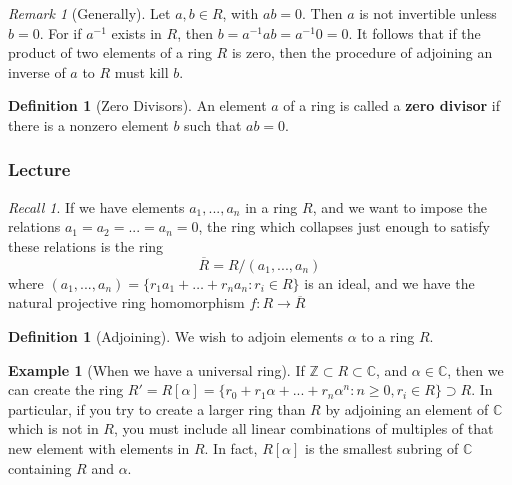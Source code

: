 \documentclass[12pt]{article}
\theoremstyle{definition}
\newtheorem{defn}[thm]{Definition}
\newtheorem{eg}[thm]{Example}
\theoremstyle{remark}
\newtheorem{rmk}[thm]{Remark}
\newtheorem*{rec}{Recall}
\numberwithin{equation}{section}
\newcommand\C{\mathbb C}    %
\newcommand\Z{\mathbb Z}    %
\newcommand\B[1]{\textbf{ #1}}
\begin{document}
\vspace{15pt}

\begin{rmk}[Generally]
        Let $a,b \in R$, with $ab = 0$. Then $a$ is not invertible unless $b=0$. For if $a^{-1}$ exists in $R$, then $b = a^{-1}ab = a^{-1}0 = 0$. It follows that if the product of two elements of a ring $R$ is zero, then the procedure of adjoining an inverse of $a$ to $R$ must kill $b$. 
\end{rmk}


\vspace{15pt}


\begin{defn}[Zero Divisors]
        An element $a$ of a ring is called a \B{zero divisor} if there is a nonzero element $b$ such that $ab = 0$.
\end{defn}


\subsubsection{Lecture}

\begin{rec}
        If we have elements $a_1,...,a_n$ in a ring $R$, and we want to impose the relations $a_1=a_2=...=a_n = 0$, the ring which collapses just enough to satisfy these relations is the ring \begin{equation}
                \overline{R} = R/(a_1,...,a_n)
        \end{equation}
        where $(a_1,...,a_n) = \{r_1a_1+\hdots +r_na_n: r_i \in R\}$ is an ideal, and we have the natural projective ring homomorphism $f:R\rightarrow \overline{R}$
\end{rec}

\vspace{15pt}

\begin{defn}[Adjoining]
        We wish to adjoin elements $\alpha$ to a ring $R$. 
\end{defn}

\vspace{15pt}


\begin{eg}[When we have a universal ring]
        If $\Z \subset R \subset \C$, and $\alpha \in \C$, then we can create the ring $R' = R[\alpha] = \{r_0+r_1\alpha + ... + r_n\alpha^n: n\geq 0, r_i \in R\} \supset R$. In particular, if you try to create a larger ring than $R$ by adjoining an element of $\C$ which is not in $R$, you must include all linear combinations of multiples of that new element with elements in $R$. In fact, $R[\alpha]$ is the smallest subring of $\C$ containing $R$ and $\alpha$.
\end{eg}
\end{document}
